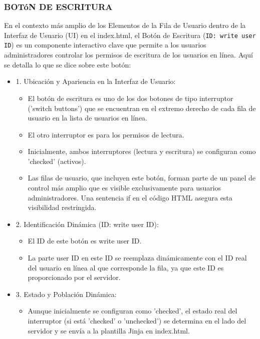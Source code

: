 \documentclass{report}
\begin{document}
\subsubsection{BOTóN DE ESCRITURA}
En el contexto más amplio de los Elementos de la Fila de Usuario dentro de la Interfaz de Usuario (UI) en el index.html, el Botón 
de Escritura (\verb|ID: write user ID|) es un componente interactivo clave que permite a los usuarios administradores controlar los 
permisos de escritura de los usuarios en línea.
Aquí se detalla lo que se dice sobre este botón:
\begin{itemize}
    \item 1. Ubicación y Apariencia en la Interfaz de Usuario:
        \begin{itemize}
            \item El botón de escritura es uno de los dos botones de tipo interruptor ('switch buttons') que se encuentran en el extremo 
            derecho de cada fila de usuario en la lista de usuarios en línea.
            \item El otro interruptor es para los permisos de lectura.
            \item Inicialmente, ambos interruptores (lectura y escritura) se configuran como 'checked' (activos).
            \item Las filas de usuario, que incluyen este botón, forman parte de un panel de control más amplio que es visible exclusivamente 
            para usuarios administradores. Una sentencia if en el código HTML asegura esta visibilidad restringida.        
        \end{itemize}
    \item 2. Identificación Dinámica (ID: write user ID):
        \begin{itemize}
            \item El ID de este botón es write user ID.
            \item La parte user ID en este ID se reemplaza dinámicamente con el ID real del usuario en línea al que corresponde la fila, ya 
            que este ID es proporcionado por el servidor.        
        \end{itemize}
    \item 3. Estado y Población Dinámica:
        \begin{itemize}
            \item Aunque inicialmente se configuran como 'checked', el estado real del interruptor (si está 'checked' o 'unchecked') se 
            determina en el lado del servidor y se envía a la plantilla Jinja en index.html.

\end{itemize}
\end{itemize}
\end{document}
